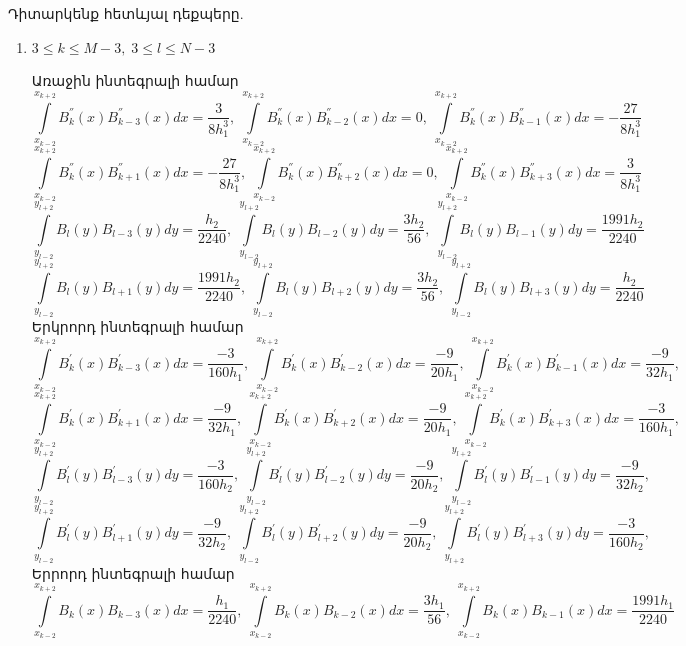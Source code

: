 \documentclass[fleqn, bachelor,subf,12pt,notitlepage]{article}
\begin{document}
\noindent Դիտարկենք  հետևյալ դեքպերը.

\begin{enumerate}

\item{$3 \leq k \leq M-3, \; 3 \leq l \leq N-3$}

Առաջին ինտեգրալի համար
$$\int \limits_{x_{k-2}}^{x_{k+2}}B_{k}^{''}(x)B_{k-3}^{''}(x)dx = \dfrac{3}{8h_{1}^3}, \; \int \limits_{x_{k-2}}^{x_{k+2}}B_{k}^{''}(x)B_{k-2}^{''}(x)dx = 0, \; \int \limits_{x_{k-2}}^{x_{k+2}}B_{k}^{''}(x)B_{k-1}^{''}(x)dx = -\dfrac{27}{8h_{1}^3}$$
$$\int \limits_{x_{k-2}}^{x_{k+2}}B_{k}^{''}(x)B_{k+1}^{''}(x)dx =-\dfrac{27}{8h_{1}^3}, \; \int \limits_{x_{k-2}}^{x_{k+2}}B_{k}^{''}(x)B_{k+2}^{''}(x)dx = 0, \; \int \limits_{x_{k-2}}^{x_{k+2}}B_{k}^{''}(x)B_{k+3}^{''}(x)dx =  \dfrac{3}{8h_{1}^3}$$
$$\int \limits_{y_{l-2}}^{y_{l+2}}B_{l}(y)B_{l-3}(y)dy=\dfrac{h_{2}}{2240}, \; \int \limits_{y_{l-2}}^{y_{l+2}}B_{l}(y)B_{l-2}(y)dy=\dfrac{3h_{2}}{56}, \; \int \limits_{y_{l-2}}^{y_{l+2}}B_{l}(y)B_{l-1}(y)dy=\dfrac{1991h_{2}}{2240}$$
$$\int \limits_{y_{l-2}}^{y_{l+2}}B_{l}(y)B_{l+1}(y)dy=\dfrac{1991h_{2}}{2240}, \; \int \limits_{y_{l-2}}^{y_{l+2}}B_{l}(y)B_{l+2}(y)dy=\dfrac{3h_{2}}{56}, \; \int \limits_{y_{l-2}}^{y_{l+2}}B_{l}(y)B_{l+3}(y)dy=\dfrac{h_{2}}{2240}$$
Երկրորդ ինտեգրալի համար
$$\int \limits_{x_{k-2}}^{x_{k+2}}B_{k}^{'}(x)B_{k-3}^{'}(x)dx=\dfrac{-3}{160h_{1}}, \; \int \limits_{x_{k-2}}^{x_{k+2}}B_{k}^{'}(x)B_{k-2}^{'}(x)dx=\dfrac{-9}{20h_{1}}, \; \int \limits_{x_{k-2}}^{x_{k+2}}B_{k}^{'}(x)B_{k-1}^{'}(x)dx=\dfrac{-9}{32h_{1}}, \;$$
$$\int \limits_{x_{k-2}}^{x_{k+2}}B_{k}^{'}(x)B_{k+1}^{'}(x)dx=\dfrac{-9}{32h_{1}}, \; \int \limits_{x_{k-2}}^{x_{k+2}}B_{k}^{'}(x)B_{k+2}^{'}(x)dx=\dfrac{-9}{20h_{1}}, \; \int \limits_{x_{k-2}}^{x_{k+2}}B_{k}^{'}(x)B_{k+3}^{'}(x)dx=\dfrac{-3}{160h_{1}}, \;$$
$$\int \limits_{y_{l-2}}^{y_{l+2}}B_{l}^{'}(y)B_{l-3}^{'}(y)dy=\dfrac{-3}{160h_{2}}, \; \int \limits_{y_{l-2}}^{y_{l+2}}B_{l}^{'}(y)B_{l-2}^{'}(y)dy=\dfrac{-9}{20h_{2}}, \; \int \limits_{y_{l-2}}^{y_{l+2}}B_{l}^{'}(y)B_{l-1}^{'}(y)dy=\dfrac{-9}{32h_{2}}, \;$$
$$\int \limits_{y_{l-2}}^{y_{l+2}}B_{l}^{'}(y)B_{l+1}^{'}(y)dy=\dfrac{-9}{32h_{2}}, \; \int \limits_{y_{l-2}}^{y_{l+2}}B_{l}^{'}(y)B_{l+2}^{'}(y)dy=\dfrac{-9}{20h_{2}}, \; \int \limits_{y_{l+2}}^{y_{l+2}}B_{l}^{'}(y)B_{l+3}^{'}(y)dy=\dfrac{-3}{160h_{2}}, \;$$
Երրորդ ինտեգրալի համար
$$\int \limits_{x_{k-2}}^{x_{k+2}}B_{k}(x)B_{k-3}(x)dx=\dfrac{h_{1}}{2240}, \; \int \limits_{x_{k-2}}^{x_{k+2}}B_{k}(x)B_{k-2}(x)dx=\dfrac{3h_{1}}{56}, \; \int \limits_{x_{k-2}}^{x_{k+2}}B_{k}(x)B_{k-1}(x)dx=\dfrac{1991h_{1}}{2240}$$

\end{enumerate}
\end{document}
